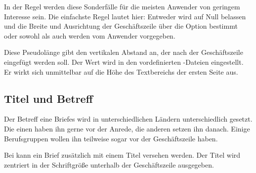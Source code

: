 In der Regel werden diese Sonderfälle für die %
\iffalse%
häufigsten Anwendungen %
\else %
meisten Anwender %
\fi %
von geringem Interesse sein. Die einfachste Regel lautet hier:
Entweder wird  auf Null belassen und die Breite und
Ausrichtung der Geschäftszeile über die Option
 bestimmt oder sowohl  als
auch  werden vom Anwender vorgegeben.%
\EndIndexGroup


\begin{Declaration}
\end{Declaration}
Diese Pseudolänge gibt den vertikalen Abstand an, der nach der Geschäftszeile
eingefügt werden soll. Der Wert wird in den vordefinierten
-Dateien
eingestellt. Er wirkt sich unmittelbar auf die Höhe des Textbereichs der
ersten Seite aus.%
%
\EndIndexGroup
%
\EndIndexGroup


\subsection{Titel und Betreff}
%
\BeginIndexGroup
{}

Der Betreff eine Briefes wird in unterschiedlichen Ländern unterschiedlich
gesetzt. Die einen haben ihn gerne vor der Anrede, die anderen setzen ihn
danach. Einige Berufsgruppen wollen ihn teilweise sogar vor der Geschäftszeile
haben.


\begin{Declaration}
\end{Declaration}
Bei \KOMAScript{} kann ein Brief zusätzlich mit einem Titel
versehen werden. Der Titel wird zentriert in der Schriftgröße 
unterhalb der Geschäftszeile ausgegeben.

